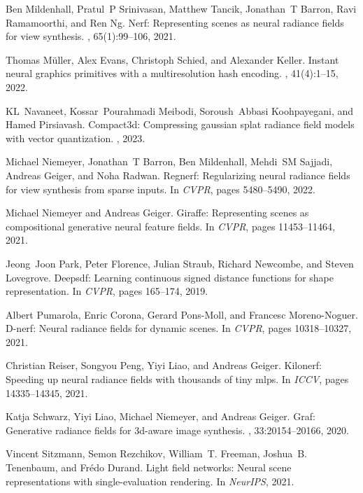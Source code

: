 \documentclass{article}
\begin{document}
{\begin{thebibliography}{10}
Ben Mildenhall, Pratul~P Srinivasan, Matthew Tancik, Jonathan~T Barron, Ravi Ramamoorthi, and Ren Ng.
\newblock Nerf: Representing scenes as neural radiance fields for view synthesis.
, 65(1):99--106, 2021.

Thomas M{\"u}ller, Alex Evans, Christoph Schied, and Alexander Keller.
\newblock Instant neural graphics primitives with a multiresolution hash encoding.
, 41(4):1--15, 2022.

KL~Navaneet, Kossar~Pourahmadi Meibodi, Soroush~Abbasi Koohpayegani, and Hamed Pirsiavash.
\newblock Compact3d: Compressing gaussian splat radiance field models with vector quantization.
, 2023.

Michael Niemeyer, Jonathan~T Barron, Ben Mildenhall, Mehdi~SM Sajjadi, Andreas Geiger, and Noha Radwan.
\newblock Regnerf: Regularizing neural radiance fields for view synthesis from sparse inputs.
\newblock In {\em CVPR}, pages 5480--5490, 2022.

Michael Niemeyer and Andreas Geiger.
\newblock Giraffe: Representing scenes as compositional generative neural feature fields.
\newblock In {\em CVPR}, pages 11453--11464, 2021.

Jeong~Joon Park, Peter Florence, Julian Straub, Richard Newcombe, and Steven Lovegrove.
\newblock Deepsdf: Learning continuous signed distance functions for shape representation.
\newblock In {\em CVPR}, pages 165--174, 2019.

Albert Pumarola, Enric Corona, Gerard Pons-Moll, and Francesc Moreno-Noguer.
\newblock D-nerf: Neural radiance fields for dynamic scenes.
\newblock In {\em CVPR}, pages 10318--10327, 2021.

Christian Reiser, Songyou Peng, Yiyi Liao, and Andreas Geiger.
\newblock Kilonerf: Speeding up neural radiance fields with thousands of tiny mlps.
\newblock In {\em ICCV}, pages 14335--14345, 2021.

Katja Schwarz, Yiyi Liao, Michael Niemeyer, and Andreas Geiger.
\newblock Graf: Generative radiance fields for 3d-aware image synthesis.
, 33:20154--20166, 2020.

Vincent Sitzmann, Semon Rezchikov, William~T. Freeman, Joshua~B. Tenenbaum, and Fr{\'e}do Durand.
\newblock Light field networks: Neural scene representations with single-evaluation rendering.
\newblock In {\em NeurIPS}, 2021.


\end{thebibliography}}
\end{document}
